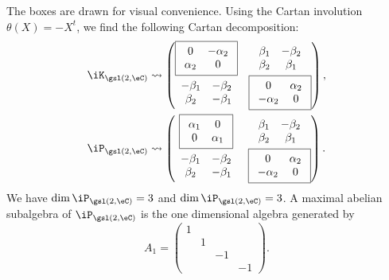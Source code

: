 The boxes are drawn for visual convenience.  Using the Cartan involution $\theta(X)=-X^t$, we find the following Cartan decomposition:
\begin{equation}
\begin{split}
\iK_{\gsl(2,\eC)}&\leadsto
\begin{pmatrix}
\boxed{
\begin{array}{cc}
0&-\alpha_2\\
\alpha_2&0
\end{array}
}&
\begin{array}{cc}
\beta_1&-\beta_2\\
\beta_2&\beta_1
\end{array}\\
\begin{array}{cc}
-\beta_1&-\beta_2\\
\beta_2&-\beta_1
\end{array}&
\boxed{
\begin{array}{cc}
0&\alpha_2\\
-\alpha_2&0
\end{array}
}
\end{pmatrix},\\
\iP_{\gsl(2,\eC)}&\leadsto
\begin{pmatrix}
\boxed{
\begin{array}{cc}
\alpha_1&0\\
0&\alpha_1
\end{array}
}&
\begin{array}{cc}
\beta_1&-\beta_2\\
\beta_2&\beta_1
\end{array}\\
\begin{array}{cc}
-\beta_1&-\beta_2\\
\beta_2&-\beta_1
\end{array}&
\boxed{
\begin{array}{cc}
0&\alpha_2\\
-\alpha_2&0
\end{array}
}
\end{pmatrix}.
\end{split}
\end{equation}
We have $\dim\iP_{\gsl(2,\eC)}=3$ and $\dim\iP_{\gsl(2,\eC)}=3$. A maximal abelian subalgebra of $\iP_{\gsl(2,\eC)}$ is the one dimensional algebra generated by
\[ 
  A_1=
\begin{pmatrix}
1\\&1\\&&-1\\&&&-1
\end{pmatrix}.
\]
